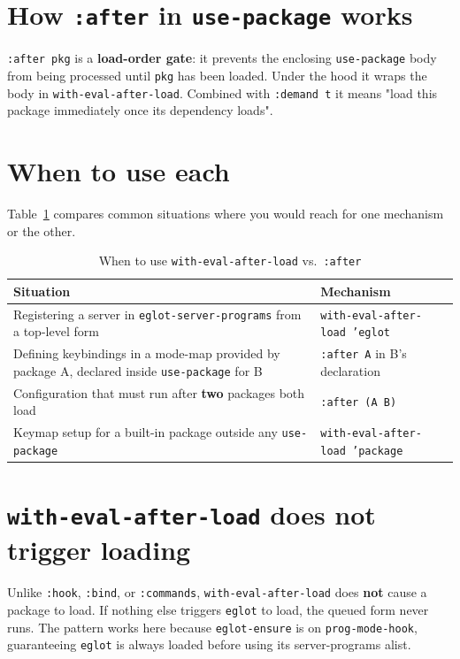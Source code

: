 \section{How \texttt{:after} in \texttt{use-package} works}\label{how-after-in-use-package-works}

\texttt{:after pkg} is a \textbf{load-order gate}: it prevents the enclosing \texttt{use-package} body from being processed until \texttt{pkg} has been loaded. Under the hood it wraps the body in \texttt{with-eval-after-load}. Combined with \texttt{:demand t} it means "load this package immediately once its dependency loads".

\section{When to use each}\label{when-to-use-each}

Table~\ref{tab:eval-after-load-situations} compares common situations where
you would reach for one mechanism or the other.

\begin{table}
\centering
\caption{When to use \texttt{with-eval-after-load} vs.\ \texttt{:after}}
\label{tab:eval-after-load-situations}
\begin{tabularx}{\linewidth}{@{}Xl@{}}
\toprule
Situation & Mechanism \\
\midrule
Registering a server in \texttt{eglot-server-programs} from a top-level form & \texttt{with-eval-after-load 'eglot} \\
Defining keybindings in a mode-map provided by package A, declared inside \texttt{use-package} for B & \texttt{:after A} in B's declaration \\
Configuration that must run after \textbf{two} packages both load & \texttt{:after (A B)} \\
Keymap setup for a built-in package outside any \texttt{use-package} & \texttt{with-eval-after-load 'package} \\
\bottomrule
\end{tabularx}
\end{table}

\section{\texttt{with-eval-after-load} does not trigger loading}\label{with-eval-after-load-does-not-trigger-loading}

Unlike \texttt{:hook}, \texttt{:bind}, or \texttt{:commands}, \texttt{with-eval-after-load} does \textbf{not} cause a package to load. If nothing else triggers \texttt{eglot} to load, the queued form never runs. The pattern works here because \texttt{eglot-ensure} is on \texttt{prog-mode-hook}, guaranteeing \texttt{eglot} is always loaded before using its server-programs alist.

